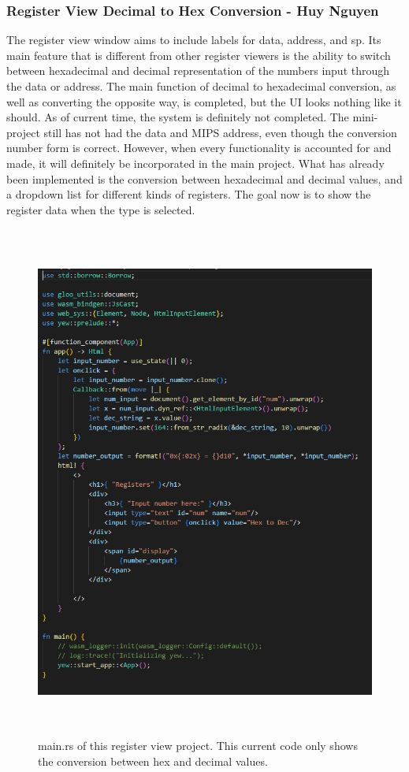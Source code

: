 \documentclass[
    paper=letter,
    parskip=half,
    fontsize=12pt,
    titlepage=firstiscover,
    toc=bibliography,
    numbers=endperiod
]{scrartcl}
\begin{document}
\subsubsection{Register View Decimal to Hex Conversion - Huy Nguyen}


The register view window aims to include labels for data, address, and
sp. Its main feature that is different from other register viewers is
the ability to switch between hexadecimal and decimal representation of
the numbers input through the data or address. The main function of
decimal to hexadecimal conversion, as well as converting the opposite
way, is completed, but the UI looks nothing like it should. As of
current time, the system is definitely not completed. The mini-project
still has not had the data and MIPS address, even though the conversion
number form is correct. However, when every functionality is accounted
for and made, it will definitely be incorporated in the main project.
What has already been implemented is the conversion between hexadecimal
and decimal values, and a dropdown list for different kinds of
registers. The goal now is to show the register data when the type is
selected.

\begin{figure}[H]
    \includegraphics[height=17cm]{huy-register-view-project}
    \caption{main.rs of this register view project. This current code only shows the conversion between hex and decimal values.}
    \label{fig:huy-register-view-project}
\end{figure}
\end{document}
